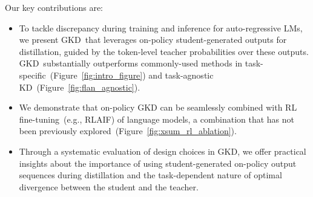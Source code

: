 \documentclass{article} %
\def\alg{GKD}
\newcommand{\addtext}[1]{#1}
\begin{document}

\addtext{Our key contributions are:
\begin{itemize}[topsep=2pt,itemsep=2pt, parsep=2pt, leftmargin=16pt]
    \item To tackle discrepancy during training and inference for auto-regressive LMs, we present \alg\ that leverages on-policy student-generated outputs for distillation, guided by the token-level teacher probabilities over these outputs. \alg\ substantially outperforms commonly-used methods in task-specific~(Figure~\ref{fig:intro_figure}) and task-agnostic KD~(Figure~\ref{fig:flan_agnostic}).
    
    \item We demonstrate that on-policy GKD can be seamlessly combined with RL fine-tuning~(e.g., RLAIF) of language models, a combination that has not been previously explored~(Figure~\ref{fig:xsum_rl_ablation}).

    \item Through a systematic evaluation of design choices in GKD, we offer practical insights about the importance of using student-generated on-policy output sequences during distillation and the task-dependent nature of optimal divergence between the student and the teacher.


\end{itemize}
}


\vspace{-0.35cm}
\end{document}
